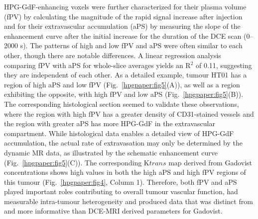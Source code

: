 HPG-GdF-enhancing voxels were further characterized for their plasma volume (fPV) by calculating the magnitude of the rapid signal increase after injection and for their extravascular accumulation (aPS) by measuring the slope of the enhancement curve after the initial increase for the duration of the DCE scan (0–2000 s).
The patterns of high and low fPV and aPS were often similar to each other, though there are notable differences.
A linear regression analysis comparing fPV with aPS for whole-slice averages yields an R$^2$ of 0.11, suggesting they are independent of each other.
As a detailed example, tumour HT01 has a region of high aPS and low fPV (Fig.~\ref{hpgpaper:fig5}(A)), as well as a region exhibiting the opposite, with high fPV and low aPS (Fig.~\ref{hpgpaper:fig5}(B)).
The corresponding histological section seemed to validate these observations, where the region with high fPV has a greater density of CD31-stained vessels and the region with greater aPS has more HPG-GdF in the extravascular compartment.
While histological data enables a detailed view of HPG-GdF accumulation, the actual rate of extravasation may only be determined by the dynamic MR data, as illustrated by the schematic enhancement curve (Fig.~\ref{hpgpaper:fig5}(C)).
The corresponding K${trans}$ map derived from Gadovist concentrations shows high values in both the high aPS and high fPV regions of this tumour (Fig.~\ref{hpgpaper:fig4}, Column 1).
Therefore, both fPV and aPS played important roles contributing to overall tumour vascular function, had measurable intra-tumour heterogeneity and produced data that was distinct from and more informative than DCE-MRI derived parameters for Gadovist.

